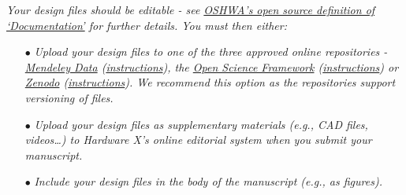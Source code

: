 \documentclass[11pt, letterpaper]{article}
\begin{document}

\textit{Your design files should be editable - see \href{https://www.oshwa.org/definition/}{OSHWA’s open source definition of ‘Documentation’} for further details. You must then either:}
\begin{itemize}
\item[$\bullet$]{\it Upload your design files to one of the three approved online repositories - \href{https://data.mendeley.com/}{Mendeley Data} (\href{https://doi.org/10.5281/zenodo.3346799}{instructions}), the \href{https://osf.io/}{Open Science Framework} (\href{https://osf.io/wgk7q/wiki/home/}{instructions}) or \href{https://zenodo.org/}{Zenodo} (\href{https://doi.org/10.5281/zenodo.3346799}{instructions}). We recommend this option as the repositories support versioning of files.}
\item[$\bullet$]{\it Upload your design files as supplementary materials (e.g., CAD files, videos…) to Hardware X’s online editorial system when you submit your manuscript.}
\item[$\bullet$]{\it Include your design files in the body of the manuscript (e.g., as figures).}
\end{itemize}
\end{document}
